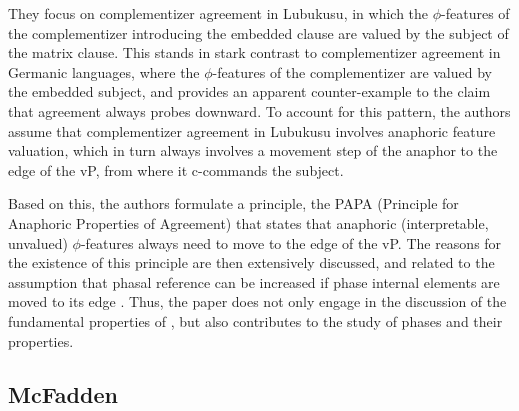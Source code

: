 \documentclass[output=paper
,modfonts
,nonflat]{langsci/langscibook}
\begin{document}
They focus on complementizer agreement in Lubukusu, in which the $\phi$-features of the complementizer introducing the embedded clause are valued by the subject of the matrix clause. This stands in stark contrast to complementizer agreement in Germanic languages, where the  $\phi$-features of the complementizer are valued by the embedded subject, and provides an apparent counter-example to the claim that agreement always probes downward. To account for this pattern, the authors assume that complementizer agreement in Lubukusu involves anaphoric feature valuation, which in turn always involves a movement step of the anaphor to the edge of the vP, from where it c-commands the subject.

Based on this, the authors formulate a principle, the PAPA (Principle for Anaphoric Properties of Agreement) that states that anaphoric (interpretable, unvalued) $\phi$-features always need to move to the edge of the vP. The reasons for the existence of this principle are then extensively discussed, and related to the assumption that phasal reference can be increased if phase internal elements are moved to its edge \citep{HinzenSheehan2013}. Thus, the paper does not only engage in the discussion of the fundamental properties of \agr{}, but also contributes to the study of phases and their properties.


\subsection{McFadden}
\label{sec:mcfadden}
\end{document}
